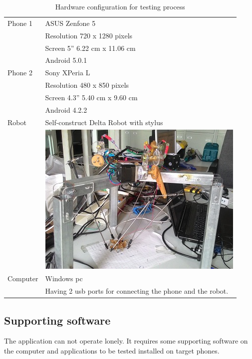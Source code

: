 \begin{table}[H]
	\centering
	\caption{Hardware configuration for testing process}	
	\label{tab:hw}
	\begin{tabularx}{0.65\textwidth}{ll}
		\toprule
		Phone 1 & ASUS Zenfone 5 \\
			  & Resolution 720 x 1280 pixels \\
			  & Screen 5'' 6.22 cm x 11.06 cm \\
			  & Android 5.0.1\\
		\midrule 
		Phone 2 & Sony XPeria L \\
			  & Resolution 480 x 850 pixels \\
			  & Screen 4.3'' 5.40 cm x 9.60 cm \\
			  & Android 4.2.2\\
		\midrule 
		Robot & Self-construct Delta Robot with stylus \\
			  & \begin{minipage}{0.7\linewidth}
			\includegraphics[width=0.8\linewidth]{Chapters/Fig/delta_robot.jpg}
		\end{minipage} \\
		\midrule 
		Computer & Windows \acrshort{pc} \\
				 & Having 2 \acrshort{usb} ports for connecting the phone and the robot. \\
		\bottomrule
	\end{tabularx}
\end{table}

\subsection{Supporting software}
The application can not operate lonely. It requires some supporting software on the computer and applications to be tested installed on target phones.

